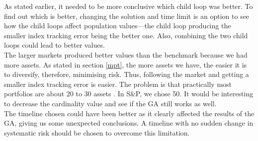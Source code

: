 \documentclass[12pt]{report}
\begin{document}
{As stated earlier, it needed to be more conclusive which child loop was better. To find out which is better, changing the solution and time limit is an option to see how the child loops affect population values—the child loop producing the smaller index tracking error being the better one. Also, combining the two child loops could lead to better values.
\\ \newline \noindent
The larger markets produced better values than the benchmark because we had more assets. As stated in section \ref{mpt}, the more assets we have, the easier it is to diversify, therefore, minimising risk. Thus, following the market and getting a smaller index tracking error is easier. The problem is that practically most portfolios are about 20 to 30 assets \cite{textbook, noofportfolio}. In S\&P, we chose 50. It would be interesting to decrease the cardinality value and see if the GA still works as well.
\\ \newline \noindent
The timeline chosen could have been better as it clearly affected the results of the GA, giving us some unexpected conclusions. A timeline with no sudden change in systematic risk should be chosen to overcome this limitation.


}
\end{document}

